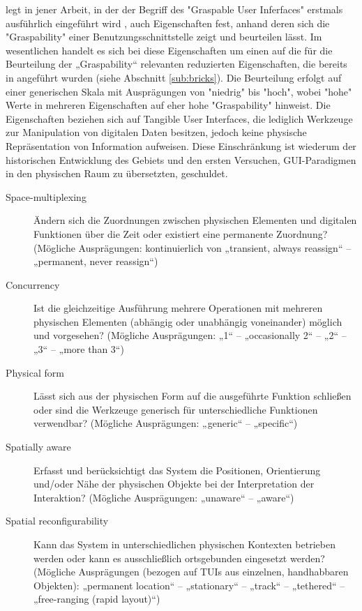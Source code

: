 \citeauthor{Fitzmaurice96} legt in jener Arbeit, in der der Begriff des "Graspable User Inferfaces" erstmals ausführlich eingeführt wird \citep{Fitzmaurice96}, auch Eigenschaften fest, anhand deren sich die "Graspability" einer Benutzungsschnittstelle zeigt und beurteilen lässt. Im wesentlichen handelt es sich bei diese Eigenschaften um einen auf die für die Beurteilung der „Graspability“ relevanten reduzierten Eigenschaften, die bereits in \citep{Fitzmaurice95} angeführt wurden (siehe Abschnitt \ref{sub:bricks}). Die Beurteilung erfolgt auf einer generischen Skala mit Ausprägungen von "niedrig" bis "hoch", wobei "hohe" Werte in mehreren Eigenschaften auf eher hohe "Graspability" hinweist. Die Eigenschaften beziehen sich auf Tangible User Interfaces, die lediglich Werkzeuge zur Manipulation von digitalen Daten besitzen, jedoch keine physische Repräsentation von Information aufweisen. Diese Einschränkung ist wiederum der historischen Entwicklung des Gebiets und den ersten Versuchen, GUI-Paradigmen in den physischen Raum zu übersetzten, geschuldet.

\begin{description}
	\item[Space-multiplexing] Ändern sich die Zuordnungen zwischen physischen Elementen und digitalen Funktionen über die Zeit oder existiert eine permanente Zuordnung? (Mögliche Ausprägungen: kontinuierlich von „transient, always reassign“ -- „permanent, never reassign“)
	\item[Concurrency] Ist die gleichzeitige Ausführung mehrere Operationen mit mehreren physischen Elementen (abhängig oder unabhängig voneinander) möglich und vorgesehen? (Mögliche Ausprägungen: „1“ -- „occasionally 2“ -- „2“ -- „3“ -- „more than 3“)
	\item[Physical form] Lässt sich aus der physischen Form auf die ausgeführte Funktion schließen oder sind die Werkzeuge generisch für unterschiedliche Funktionen verwendbar? (Mögliche Ausprägungen: „generic“ -- „specific“) 
	\item[Spatially aware] Erfasst und berücksichtigt das System die Positionen, Orientierung und/oder Nähe der physischen Objekte bei der Interpretation der Interaktion? (Mögliche Ausprägungen: „unaware“ -- „aware“)
	\item[Spatial reconfigurability] Kann das System in unterschiedlichen physischen Kontexten betrieben werden oder kann es ausschließlich ortsgebunden eingesetzt werden? (Mögliche Ausprägungen (bezogen auf \glspl{TUI} aus einzelnen, handhabbaren Objekten): „permanent location“ -- „stationary“ -- „track“ -- „tethered“ -- „free-ranging (rapid layout)“)
\end{description}

